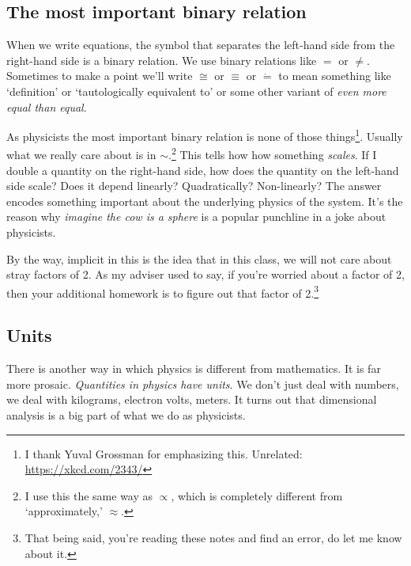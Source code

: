 \subsection{The most important binary relation}


When we write equations, the symbol that separates the left-hand side from the right-hand side is a binary relation. We use binary relations like $=$ or $\neq$. Sometimes to make a point we’ll write $\cong$ or $\equiv$ or $\dot =$ to mean something like `definition’ or `tautologically equivalent to’ or some other variant of \emph{even more equal than equal}. 

As physicists the most important binary relation is none of those things\footnote{I thank Yuval Grossman for emphasizing this. Unrelated: \url{https://xkcd.com/2343/}}. Usually what we really care about is in $\sim$.\footnote{I use this the same way as $\propto$, which is completely different from `approximately,’ $\approx$.} This tells how how something \emph{scales}. If I double a quantity on the right-hand side, how does the quantity on the left-hand side scale? Does it depend linearly? Quadratically? Non-linearly? The answer encodes something important about the underlying physics of the system. It's the reason why \emph{imagine the cow is a sphere} is a popular punchline in a joke about physicists. 


By the way, implicit in this is the idea that in this class, we will not care about stray factors of 2. As my adviser used to say, if you’re worried about a factor of 2, then your additional homework is to figure out that factor of 2.\footnote{That being said, you're reading these notes and find an error, do let me know about it.} 

\subsection{Units}

There is another way in which physics is different from mathematics. It is far more prosaic. \emph{Quantities in physics have units}. We don’t just deal with numbers, we deal with kilograms, electron volts, meters. It turns out that dimensional analysis is a big part of what we do as physicists. 
